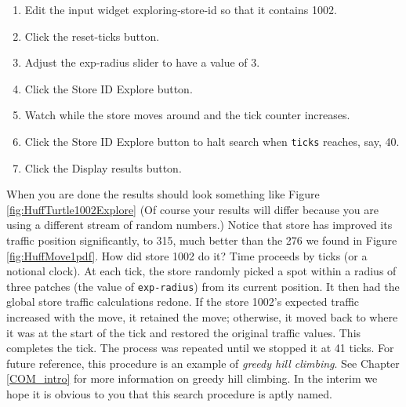 \begin{enumerate}
\item Edit the input widget exploring-store-id so that it contains 1002.
\item Click the reset-ticks button.
\item Adjust the exp-radius slider to have a value of 3.
\item Click the Store ID Explore button.
\item Watch while the store moves around and the tick counter increases. 
\item Click the Store ID Explore button to halt search when {\tt ticks} reaches, say, 40.
\item Click the Display results button.
\end{enumerate}
When you are done the results should look something like Figure \ref{fig:HuffTurtle1002Explore} (Of course your results will differ because you are using a different stream of random numbers.) Notice that store has improved its traffic position significantly, to 315, much better than the 276 we found in Figure \ref{fig:HuffMove1pdf}.  How did store 1002 do it? Time proceeds by ticks (or a notional clock). At each tick, the store randomly picked a spot within a radius of three patches (the value of {\tt exp-radius}) from its current position. It then had the global store traffic calculations redone. If the store 1002's expected traffic increased with the move, it retained the move; otherwise, it moved back to where it was at the start of the tick and restored the original traffic values. This completes the tick. The process was repeated until we stopped it at 41 ticks.  For future reference, this procedure is an example of \emph{greedy hill climbing}. See Chapter \ref{COM_intro} for more information on greedy hill climbing. In the interim we hope it is obvious to you that this search procedure is aptly named.




